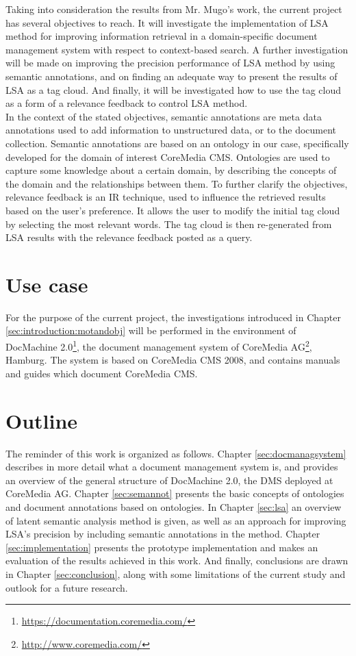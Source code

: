 Taking into consideration the results from Mr. Mugo's work, the current project has several objectives to reach. It will investigate the implementation of LSA method for improving information retrieval in a domain-specific document management system with respect to context-based search. A further investigation will be made on improving the precision performance of LSA method by using semantic annotations, and on finding an adequate way to present the results of LSA as a tag cloud. And finally, it will be investigated how to use the tag cloud as a form of a relevance feedback to control LSA method. \\

In the context of the stated objectives, semantic annotations are meta data annotations used to add information to unstructured data, or to the document collection. Semantic annotations are based on an ontology in our case, specifically developed for the domain of interest CoreMedia CMS. Ontologies are used to capture some knowledge about a certain domain, by describing the concepts of the domain and the relationships between them. To further clarify the objectives, relevance feedback is an IR technique, used to influence the retrieved results based on the user's preference. It allows the user to modify the initial tag cloud by selecting the most relevant words. The tag cloud is then re-generated from LSA results with the relevance feedback posted as a query. \\

\section{Use case}
\label{sec:introduction:usecase}
For the purpose of the current project, the investigations introduced in Chapter \ref{sec:introduction:motandobj} will be performed in the environment of DocMachine 2.0\footnote{\url{https://documentation.coremedia.com/}}, the document management system of CoreMedia AG\footnote{\url{http://www.coremedia.com/}}, Hamburg. The system is based on CoreMedia CMS 2008, and contains manuals and guides which document CoreMedia CMS. \\ 

\section{Outline}
\label{sec:introduction:outline}
The reminder of this work is organized as follows. Chapter \ref{sec:docmanagsystem} describes in more detail what a document management system is, and provides an overview of the general structure of DocMachine 2.0, the DMS deployed at CoreMedia AG. Chapter \ref{sec:semannot} presents the basic concepts of ontologies and document annotations based on ontologies. In Chapter \ref{sec:lsa} an overview of latent semantic analysis method is given, as well as an approach for improving LSA's precision by including semantic annotations in the method. Chapter \ref{sec:implementation} presents the prototype implementation and makes an evaluation of the results achieved in this work. And finally, conclusions are drawn in Chapter \ref{sec:conclusion}, along with some limitations of the current study and outlook for a future research.   \\ 
